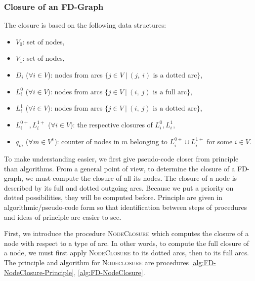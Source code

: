 \subsubsection{Closure of an FD-Graph}

The closure is based on the following data structures:
\begin{itemize}
	\item $V_0$: set of  nodes,
	\item $V_1$: set of  nodes,
	\item $D_i$ ($\forall i \in V$): nodes from  arcs
	$\{j \in V \ | \ (j, \  i) \text{ is a dotted arc} \}$,
	\item $L_{i}^0$ ($\forall i \in V$): nodes from  arcs
	$\{j \in V \ | \ (i, \  j) \text{ is a full arc} \}$,
	\item $L_{i}^1$ ($\forall i \in V$): nodes from  	
	arcs $\{j \in V \ | \ (i, \  j) \text{ is a dotted arc} \}$,
	\item $L_{i}^{0+}, L_{i}^{1+}$ ($\forall i \in V$): the respective closures
	of $L_i^0, L_i^1$,
	\item $q_m$ ($\forall m \in V^1$): counter of nodes in $m$ belonging to 
	$L_i^{0+} \cup L_i^{1+}$ for some $i \in V$.
\end{itemize}

\noindent To make understanding easier, we first give pseudo-code closer from
principle than algorithms. From a general point of view, to determine the 
closure of a FD-graph, we must compute the closure of all its nodes. The 
closure of a node is described by its full and dotted outgoing arcs. Because we
put a priority on dotted possibilities, they will be computed before. Principle
are given in algorithmic/pseudo-code form so that identification between steps
of procedures and ideas of principle are easier to see.

\vspace{1.2em}

First, we introduce the procedure \textsc{NodeClosure} which computes the 
closure of a node with respect to a type of arc. In other words, to compute the 
full closure of a node, we must first apply \textsc{NodeClosure} to its dotted 
arcs, then to its full arcs. The principle and algorithm for 
\textsc{Nodeclosure} are procedures \ref{alg:FD-NodeClosure-Principle}, 
\ref{alg:FD-NodeClosure}. 

\vspace{1.2em}

